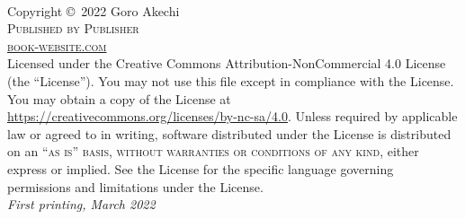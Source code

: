 \documentclass[
  12pt, %
  letterpaper,
]{LegrandOrangeBook}
\begin{document}

\thispagestyle{empty} %

~\vfill %

\noindent Copyright \copyright\ 2022 Goro Akechi\\ %

\noindent \textsc{Published by Publisher}\\ %

\noindent \textsc{\href{https://www.latextemplates.com/template/legrand-orange-book}{book-website.com}}\\ %

\noindent Licensed under the Creative Commons Attribution-NonCommercial 4.0
License (the ``License''). You may not use this file except in compliance with
the License. You may obtain a copy of the License at
\url{https://creativecommons.org/licenses/by-nc-sa/4.0}. Unless required by
applicable law or agreed to in writing, software distributed under the License
is distributed on an \textsc{``as is'' basis, without warranties or conditions
  of any kind}, either express or implied. See the License for the specific
language governing permissions and limitations under the License.\\ %

\noindent \textit{First printing, March 2022} %


\pagestyle{empty} %

\tableofcontents %



\pagestyle{fancy} %

\cleardoublepage %
\end{document}
